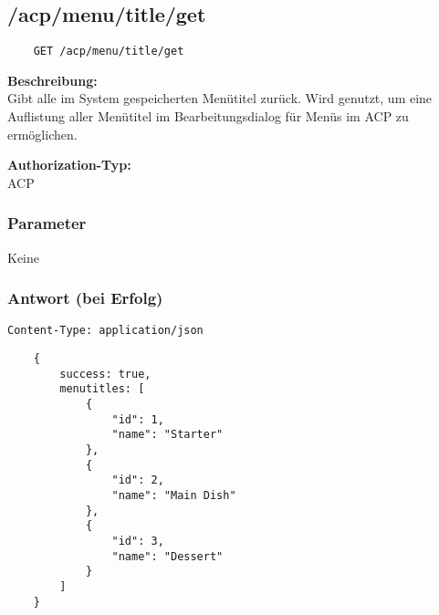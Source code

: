 \subsection{/acp/menu/title/get}

\begin{lstlisting}
    GET /acp/menu/title/get
\end{lstlisting}

\textbf{Beschreibung:} \\
Gibt alle im System gespeicherten Menütitel zurück. Wird genutzt, um eine Auflistung aller Menütitel im Bearbeitungsdialog für Menüs im ACP zu ermöglichen.

\textbf{Authorization-Typ:} \\
ACP

\subsubsection{Parameter}
Keine

\subsubsection{Antwort (bei Erfolg)}

\lstinline{Content-Type: application/json}
\begin{lstlisting}
    {
        success: true, 
        menutitles: [
            {
                "id": 1,
                "name": "Starter"
            },
            {
                "id": 2,
                "name": "Main Dish"
            },
            {
                "id": 3,
                "name": "Dessert"
            }
        ]
    }
\end{lstlisting}
